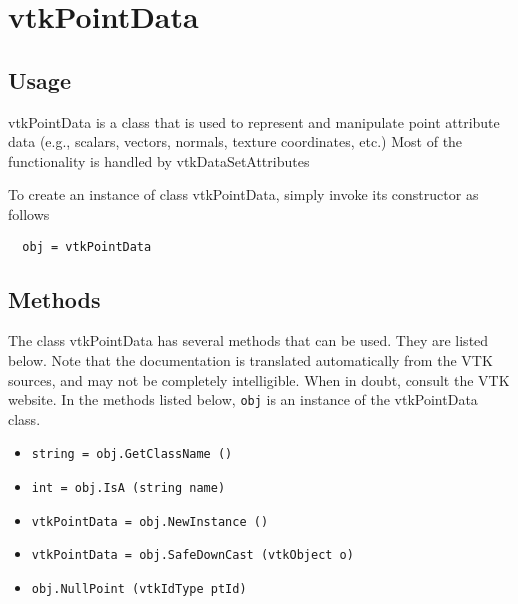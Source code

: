 \section{vtkPointData}

\subsection{Usage}

 vtkPointData is a class that is used to represent and manipulate
 point attribute data (e.g., scalars, vectors, normals, texture 
 coordinates, etc.) Most of the functionality is handled by 
 vtkDataSetAttributes

To create an instance of class vtkPointData, simply
invoke its constructor as follows
\begin{verbatim}
  obj = vtkPointData
\end{verbatim}
\subsection{Methods}

The class vtkPointData has several methods that can be used.
  They are listed below.
Note that the documentation is translated automatically from the VTK sources,
and may not be completely intelligible.  When in doubt, consult the VTK website.
In the methods listed below, \verb|obj| is an instance of the vtkPointData class.
\begin{itemize}
\item  \verb|string = obj.GetClassName ()|

\item  \verb|int = obj.IsA (string name)|

\item  \verb|vtkPointData = obj.NewInstance ()|

\item  \verb|vtkPointData = obj.SafeDownCast (vtkObject o)|

\item  \verb|obj.NullPoint (vtkIdType ptId)|

\end{itemize}
